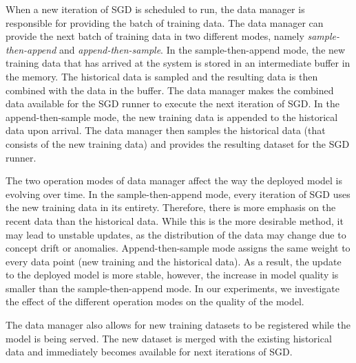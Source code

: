 When a new iteration of SGD is scheduled to run, the data manager is responsible for providing the batch of training data.
The data manager can provide the next batch of training data in two different modes, namely \textit{sample-then-append} and \textit{append-then-sample}.
In the sample-then-append mode, the new training data that has arrived at the system is stored in an intermediate buffer in the memory.
The historical data is sampled and the resulting data is then combined with the data in the buffer.
The data manager makes the combined data available for the SGD runner to execute the next iteration of SGD.
In the append-then-sample mode, the new training data is appended to the historical data upon arrival.
The data manager then samples the historical data (that consists of the new training data) and provides the resulting dataset for the SGD runner.

The two operation modes of data manager affect the way the deployed model is evolving over time.
In the sample-then-append mode, every iteration of SGD uses the new training data in its entirety.
Therefore, there is more emphasis on the recent data than the historical data.
While this is the more desirable method, it may lead to unstable updates, as the distribution of the data may change due to concept drift or anomalies.
Append-then-sample mode assigns the same weight to every data point (new training and the historical data).
As a result, the update to the deployed model is more stable, however, the increase in model quality is smaller than the sample-then-append mode.
In our experiments, we investigate the effect of the different operation modes on the quality of the model.


The data manager also allows for new training datasets to be registered while the model is being served.
The new dataset is merged with the existing historical data and immediately becomes available for next iterations of SGD.

